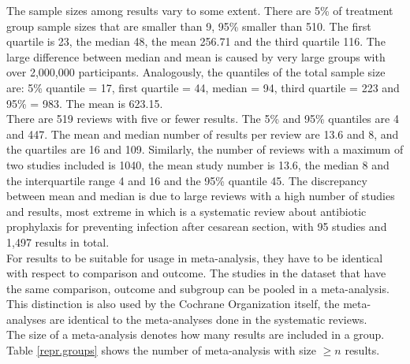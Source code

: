 \documentclass[11pt,a4paper,twoside]{book}\usepackage[]{graphicx}\usepackage[]{color}
\begin{document}
The sample sizes among results vary to some extent. There are 5\% of treatment group sample sizes that are smaller than 9, 95\% smaller than 510. The first quartile is 23, the median 48, the mean 256.71 and the third quartile 116. The large difference between median and mean is caused by very large groups with over 2,000,000 participants. Analogously, the quantiles of the total sample size are: 5\% quantile = 17, first quartile = 44, median = 94, third quartile = 223 and 95\% = 983. The mean is 623.15. \\
There are 519 reviews with five or fewer results. The 5\% and 95\% quantiles are 4 and 447. The mean and median number of results per review are 13.6 and 8, and the quartiles are 16 and 109. Similarly, the number of reviews with a maximum of two studies included is 1040, the mean study number is 13.6, the median 8 and the interquartile range 4 and 16 and the 95\% quantile 45. The discrepancy between mean and median is due to large reviews with a high number of studies and results, most extreme in %
which is a systematic review about antibiotic prophylaxis for preventing infection after cesarean section, with 95 studies and 1,497 results in total.\\
For results to be suitable for usage in meta-analysis, they have to be identical with respect to comparison and outcome. The studies in the dataset that have the same comparison, outcome and subgroup can be pooled in a meta-analysis. This distinction is also used by the Cochrane Organization itself, \ie the meta-analyses are identical to the meta-analyses done in the systematic reviews.\\ %
The size of a meta-analysis denotes how many results are included in a group. Table \ref{repr.groups} shows the number of meta-analysis with size $\geq n$ results. 
\end{document}
